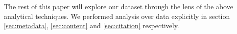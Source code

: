 
The rest of this paper will explore our dataset through the lens of the above analytical techniques. 
We performed analysis over data explicitly in section \ref{sec:metadata}, \ref{sec:content} and \ref{sec:citation} respectively.